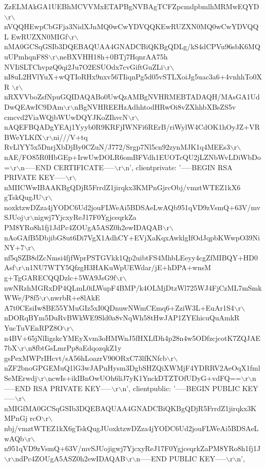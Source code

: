 \begin{DoxyCode}
      ZzELMAkGA1UEBhMCVVMxETAPBgNVBAgTCFZpcmdpbmlhMRMwEQYD\(\backslash\)r\(\backslash\)nVQQHEwpCbGFja3NidXJnMQ0wCwYDVQQKEwRUZXN0MQ0wCwYDVQQL
      EwRUZXN0MIGf\(\backslash\)r\(\backslash\)nMA0GCSqGSIb3DQEBAQUAA4GNADCBiQKBgQDLg/kS4dCPVu96sbK6MQuUPmhqnF8S\(\backslash\)r\(\backslash\)neBXVHH18h+0BTj7HqnrAA75h
      NVIiSLTChvpzQ0qi2Ju7O2ESUOdx7cvGiftGuZLi\(\backslash\)r\(\backslash\)nI8uL2HVlYuX+wQTIoRHx9nxv56TIiqnPg5d05vSTLXoiJg5uac3a6+4vnhhTo0XR
      \(\backslash\)r\(\backslash\)nRXVVboZsfNpuGQIDAQABo0UwQzAMBgNVHRMEBTADAQH/MAsGA1UdDwQEAwIC9DAm\(\backslash\)r\(\backslash\)nBgNVHREEHzAdhhtodHRwOi8vZXhhbXBsZS5v
      cmcvd2ViaWQjbWUwDQYJKoZIhvcN\(\backslash\)r\(\backslash\)nAQEFBQADgYEAj1Yyyb0R9KRFjIWNFi6RErB/riWylW4CdOK1hOyJZ+VRBWeYLKfX\(\backslash\)r\(\backslash\)ni///V+tq
      RvLlYY5x5DnrjXbDjBy0CZuN/J772/Srgp7Nl5cn92zynMJK1q4MEEs3\(\backslash\)r\(\backslash\)nAE/FO85R0HbGEp+IrwUwDOLR6omBFVdh1EUOTcQU2jLZNbWvLDiWbDo=\(\backslash\)r\(\backslash\)n-----END CERTIFICATE-----\(\backslash\)r\(\backslash\)n',
  clientprivate: '-----BEGIN RSA PRIVATE
       KEY-----\(\backslash\)r\(\backslash\)nMIICWwIBAAKBgQDjR5FrrdZ1jirqkx3KMPnGjrcObj/vmztWTEZ1kX6
      gTskQugJU\(\backslash\)r\(\backslash\)noxktzwDZza4jYODC6Ud2jouFLWeAi5BDSAeLwAQb951qVD9zVsmQ+63V/mvSJUoj\(\backslash\)r\(\backslash\)nigwj7YjcxyReJ17F0YgjceqrkZa
      PM8YRo8h1fj1JdPc4ZOUgA5ASZ0h2ewIDAQAB\(\backslash\)r\(\backslash\)nAoGAfB5DbjibG8ut6Di7VgX1AdhCY+EVjXaKqxAwklgIfOdJqpbKWwpO39NiNY+7\(\backslash\)r\(\backslash\)
      nf5qSZB8dZcNmsi4fjfWprPSTGVkk1Qp2uibtFS4MhbLEeyy4cgZfMIBQY+HD0Asf\(\backslash\)r\(\backslash\)n1NU7WTY5QfzgH3HAKuWpUEWdar/jE+hDPA+wnsM
      g+TgGARECQQDzlc+5WA9JsG9f\(\backslash\)r\(\backslash\)nwNRzhMGRxDP4QLmL0iLWupF4BMP/k4OLMjDtzWl725WJ4FjCzML7mSmkWWe/P8f5\(\backslash\)r\(\backslash\)nwrbR+e8lAkE
      A7t0CEsiIw8BE55YMuGIz5xI0QDnuwNWmCEmq6+ZziW3L+EuAr1S4\(\backslash\)r\(\backslash\)nDORqBYm5DuRvBWkWE9Sld0a8vNqWh58tHwJAP1ZYEhicuQuAmkR
      YucTuVEnRPZ8O\(\backslash\)r\(\backslash\)n4BV+65jNlIigskcYMEyXvm3oHMWnJ5fHXLfDh4p28n4w5ODfzcjcotK7ZQJAE7bX\(\backslash\)r\(\backslash\)n8fbtGsLmrPp8aEdqozqkZ1y
      gsPexMWPrIHcvt/sA56hLoazrV90ORxC73lfKNfcb\(\backslash\)r\(\backslash\)nZF2bnoGPGEMuQ1lG3wJAPnHysm3DgbSHZQiXWMjF4YDRRV2AeOqX1fmlSeMErwdj\(\backslash\)r\(\backslash\)ncwIs+ikIBnOwUOh6liJ7yK1YnckDTZTOfUDyG+vdFQ==\(\backslash\)r\(\backslash\)n-----END RSA PRIVATE KEY-----\(\backslash\)r\(\backslash\)n',
  clientpublic: '-----BEGIN PUBLIC
       KEY-----\(\backslash\)r\(\backslash\)nMIGfMA0GCSqGSIb3DQEBAQUAA4GNADCBiQKBgQDjR5FrrdZ1jirqkx3KMPnGj
      rcO\(\backslash\)r\(\backslash\)nbj/vmztWTEZ1kX6gTskQugJUoxktzwDZza4jYODC6Ud2jouFLWeAi5BDSAeLwAQb\(\backslash\)r\(\backslash\)n951qVD9zVsmQ+63V/mvSJUojigwj7YjcxyReJ17F0YgjceqrkZaPM8YRo8h1fj1J\(\backslash\)r\(\backslash\)ndPc4ZOUgA5ASZ0h2ewIDAQAB\(\backslash\)r\(\backslash\)n-----END PUBLIC KEY-----\(\backslash\)r\(\backslash\)n',

\end{DoxyCode}
